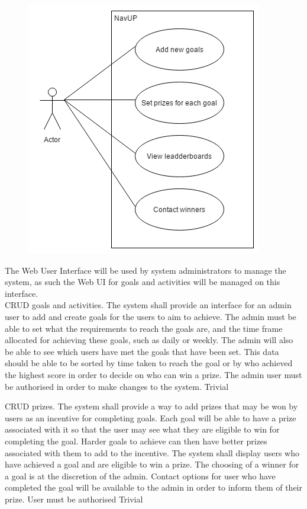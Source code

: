 \begin{figure} 
  \includegraphics[width=\textwidth]{diagrams/Specific_Requirements/Goals_WebUI_Actor_Syetem_Interaction.png}
\end{figure}

The Web User Interface will be used by system administrators to manage the system, as such the Web UI for goals and activities will be managed on this interface.
\\
\bigskip
\FuncReq
{CRUD goals and activities.}
{The system shall provide an interface for an admin user to add and create goals for the users to aim to achieve. The admin must be able to set what the requirements to reach the goals are, and the time frame allocated for achieving these goals, such as daily or weekly. The admin will also be able to see which users have met the goals that have been set. This data should be able  to be sorted by time taken to reach the goal or by who achieved the highest score in order to decide on who can win a prize.}
{The admin user must be authorised in order to make changes to the system.}
{Trivial}

\FuncReq
{CRUD prizes.}
{The system shall provide a way to add prizes that may be won by users as an incentive for completing goals. Each goal will be able to have a prize associated with it so that the user may see what they are eligible to win for completing the goal. Harder goals to achieve can then have better prizes associated with them to add to the incentive. The system shall display users who have achieved a goal and are eligible to win a prize. The choosing of a winner for a goal is at the discretion of the admin. Contact options for user who have completed the goal will be available to the admin in order to inform them of their prize.}
{User must be authorised}
{Trivial}
